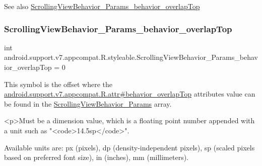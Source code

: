 \begin{DoxySeeAlso}{See also}
\hyperlink{classandroid_1_1support_1_1v7_1_1appcompat_1_1R_1_1styleable_abf0bf54a4df691d236a3aa5891732c78}{Scrolling\+View\+Behavior\+\_\+\+Params\+\_\+behavior\+\_\+overlap\+Top} 
\end{DoxySeeAlso}
\mbox{\label{classandroid_1_1support_1_1v7_1_1appcompat_1_1R_1_1styleable_abf0bf54a4df691d236a3aa5891732c78}} 
\subsubsection{\texorpdfstring{Scrolling\+View\+Behavior\+\_\+\+Params\+\_\+behavior\+\_\+overlap\+Top}{ScrollingViewBehavior\_Params\_behavior\_overlapTop}}
{\footnotesize\ttfamily int android.\+support.\+v7.\+appcompat.\+R.\+styleable.\+Scrolling\+View\+Behavior\+\_\+\+Params\+\_\+behavior\+\_\+overlap\+Top = 0\hspace{0.3cm}{\ttfamily [static]}}

This symbol is the offset where the \hyperlink{classandroid_1_1support_1_1v7_1_1appcompat_1_1R_1_1attr_a53ab63799d595c3c29a56e8c4364acd3}{android.\+support.\+v7.\+appcompat.\+R.\+attr\#behavior\+\_\+overlap\+Top} attribute\textquotesingle{}s value can be found in the \hyperlink{classandroid_1_1support_1_1v7_1_1appcompat_1_1R_1_1styleable_a0f3b26fd53511c29976d0f2c70a6b4f4}{Scrolling\+View\+Behavior\+\_\+\+Params} array.

\begin{DoxyVerb}      <p>Must be a dimension value, which is a floating point number appended with a unit such as "<code>14.5sp</code>".
\end{DoxyVerb}
 Available units are\+: px (pixels), dp (density-\/independent pixels), sp (scaled pixels based on preferred font size), in (inches), mm (millimeters). 

